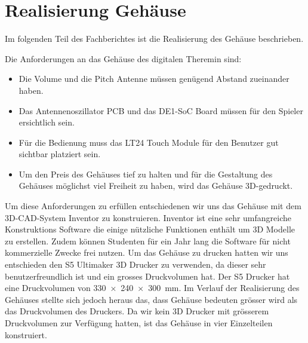 \clearpage
\section{Realisierung Gehäuse}\label{sec:Realisierung Gehäuse}
Im folgenden Teil des Fachberichtes ist die Realisierung des Gehäuse beschrieben. 

Die Anforderungen an das Gehäuse des digitalen Theremin sind:
\begin{itemize}
	\item Die Volume und die Pitch Antenne müssen genügend Abstand zueinander haben.
	\item Das Antennenoszillator PCB und das DE1-SoC Board müssen für den Spieler ersichtlich sein.
	\item Für die Bedienung muss das LT24 Touch Module für den Benutzer gut sichtbar platziert sein.
	\item Um den Preis des Gehäuses tief zu halten und für die Gestaltung des Gehäuses möglichst viel Freiheit zu haben, wird das Gehäuse 3D-gedruckt.  
\end{itemize}

Um diese Anforderungen zu erfüllen entschiedenen wir uns das Gehäuse mit dem 3D-CAD-System Inventor zu konstruieren. Inventor ist eine sehr umfangreiche Konstruktions Software die einige nützliche Funktionen enthält um 3D Modelle zu erstellen. Zudem können Studenten für ein Jahr lang die Software für nicht kommerzielle Zwecke frei nutzen.
Um das Gehäuse zu drucken hatten wir uns entschieden den S5 Ultimaker 3D Drucker zu verwenden, da dieser sehr benutzerfreundlich ist und ein grosses Druckvolumen hat. 
Der S5 Drucker hat eine Druckvolumen von \SI{330x240x300}{mm}. 
Im Verlauf der Realisierung des Gehäuses stellte sich jedoch heraus das, dass Gehäuse bedeuten grösser wird als das Druckvolumen des Druckers. Da wir kein 3D Drucker mit grösserem Druckvolumen zur Verfügung hatten, ist das Gehäuse in vier Einzelteilen konstruiert. 

